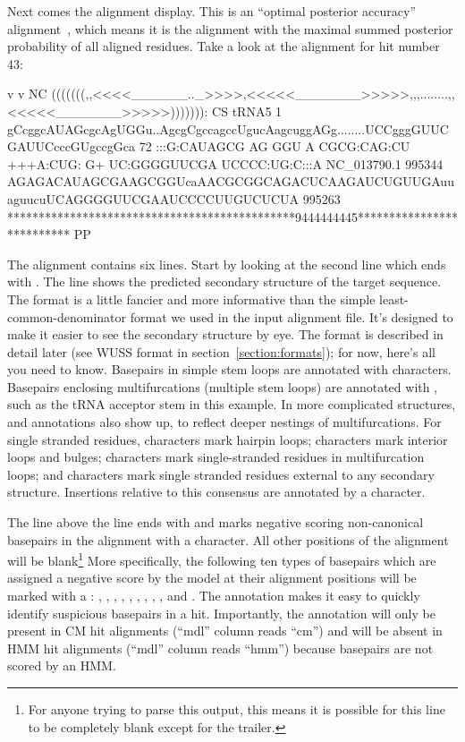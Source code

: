 Next comes the alignment display. This is an ``optimal
posterior accuracy'' alignment~\citep{Holmes98}, which means it is the
alignment with the maximal summed posterior probability of all
aligned residues. Take a look at the alignment for hit number 43:

\begin{sreoutput}
                                 v         v                                                            NC
                     (((((((,,<<<<______.._>>>>,<<<<<_______>>>>>,,,........,,<<<<<_______>>>>>))))))): CS
        tRNA5      1 gCcggcAUAGcgcAgUGGu..AgcgCgccagccUgucAagcuggAGg........UCCgggGUUCGAUUCcccGUgccgGca 72    
                     :::G:CAUAGCG AG GGU  A CGCG:CAG:CU +++A:CUG: G+        UC:GGGGUUCGA UCCCC:UG:C:::A
  NC_013790.1 995344 AGAGACAUAGCGAAGCGGUcaAACGCGGCAGACUCAAGAUCUGUUGAuuaguucuUCAGGGGUUCGAAUCCCCUUGUCUCUA 995263
                     **********************************************9444444445************************** PP
\end{sreoutput}

The alignment contains six lines. Start by looking at the second line
which ends with .  The line shows the predicted secondary
structure of the target sequence. The format is a little fancier and
more informative than the simple least-common-denominator format we
used in the input alignment file. It's designed to make it easier to
see the secondary structure by eye. The format is described in detail
later (see WUSS format in section~\ref{section:formats}); for now,
here's all you need to know. Basepairs in simple stem loops are
annotated with \otext{<>} characters. Basepairs enclosing
multifurcations (multiple stem loops) are annotated with \otext{()},
such as the tRNA acceptor stem in this example. In more complicated
structures, \otext{[]} and \otext{\{\}} annotations also show up, to
reflect deeper nestings of multifurcations. For single stranded
residues, \otext{\_} characters mark hairpin loops; \otext{-}
characters mark interior loops and bulges; \otext{,} characters mark
single-stranded residues in multifurcation loops; and \otext{:}
characters mark single stranded residues external to any secondary
structure. Insertions relative to this consensus are annotated by a
 character.

The line above the  line ends with  and marks
negative scoring non-canonical basepairs in the alignment with a
 character. All other positions of the alignment will be
blank\footnote{For anyone trying to parse this output, this means it
is possible for this line to be completely blank except for the
 trailer.} More specifically, the following ten types of
basepairs which are assigned a negative score by the model at their
alignment positions will be marked with a : ,
, , , , ,
, , , and . The 
annotation makes it easy to quickly identify suspicious basepairs in
a hit. Importantly, the  annotation will only be present in
CM hit alignments (``mdl'' column reads ``cm'') and will be absent in
HMM hit alignments (``mdl'' column reads ``hmm'') because basepairs
are not scored by an HMM.

